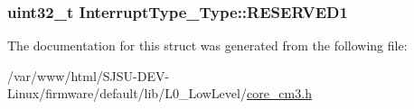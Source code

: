 \subsubsection[{\texorpdfstring{R\+E\+S\+E\+R\+V\+E\+D1}{RESERVED1}}]{\setlength{\rightskip}{0pt plus 5cm}uint32\+\_\+t Interrupt\+Type\+\_\+\+Type\+::\+R\+E\+S\+E\+R\+V\+E\+D1}\hypertarget{structInterruptType__Type_a45933eb981309d50f943ec3af67f17be}{}\label{structInterruptType__Type_a45933eb981309d50f943ec3af67f17be}


The documentation for this struct was generated from the following file\+:\begin{DoxyCompactItemize}
\item 
/var/www/html/\+S\+J\+S\+U-\/\+D\+E\+V-\/\+Linux/firmware/default/lib/\+L0\+\_\+\+Low\+Level/\hyperlink{core__cm3_8h}{core\+\_\+cm3.\+h}\end{DoxyCompactItemize}
